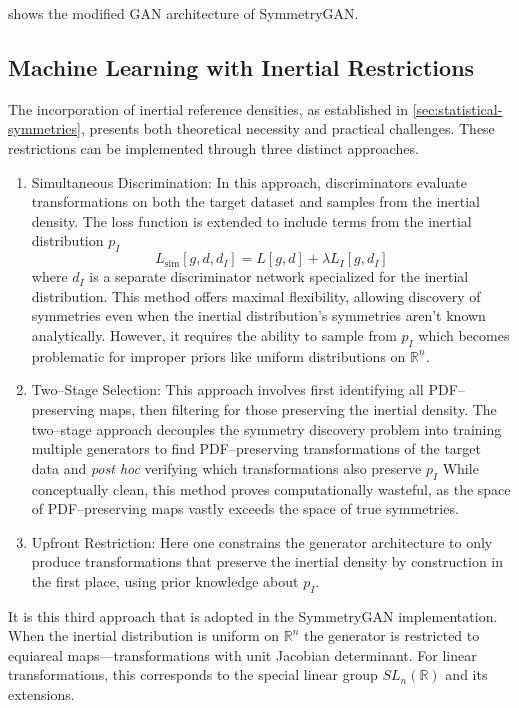     shows the modified GAN architecture of SymmetryGAN.
    
    \subsection{Machine Learning with Inertial Restrictions}
    The incorporation of inertial reference densities, as established in \cref{sec:statistical-symmetries}, presents both theoretical necessity and practical challenges.
    These restrictions can be implemented through three distinct approaches.
    \begin{enumerate}
        \item Simultaneous Discrimination:
            In this approach, discriminators evaluate transformations on both the target dataset and samples from the inertial density.
            The loss function is extended to include terms from the inertial distribution \(p_I\)
            \[
                L_{\text{sim}}[g,d,d_I] = L[g,d] + \lambda L_I[g,d_I]
            \]
            where \(d_I\) is a separate discriminator network specialized for the inertial distribution.
            This method offers maximal flexibility, allowing discovery of symmetries even when the inertial distribution's symmetries aren't known analytically.
            However, it requires the ability to sample from \(p_I\) which becomes problematic for improper priors like uniform distributions on \(\mathbb{R}^n\).
        \item Two--Stage Selection:
            This approach involves first identifying all PDF--preserving maps, then filtering for those preserving the inertial density.
            The two--stage approach decouples the symmetry discovery problem into training multiple generators to find PDF--preserving transformations of the target data and \textit{post hoc} verifying which transformations also preserve \(p_I\)
            While conceptually clean, this method proves computationally wasteful, as the space of PDF--preserving maps vastly exceeds the space of true symmetries.
        \item Upfront Restriction:
            Here one constrains the generator architecture to only produce transformations that preserve the inertial density by construction in the first place, using prior knowledge about \(p_I\).
    \end{enumerate}
    It is this third approach that is adopted in the SymmetryGAN implementation.
    When the inertial distribution is uniform on \(\mathbb{R}^n\) the generator is restricted to equiareal maps---transformations with unit Jacobian determinant.
    For linear transformations, this corresponds to the special linear group \(SL_n(\mathbb{R})\) and its extensions.


